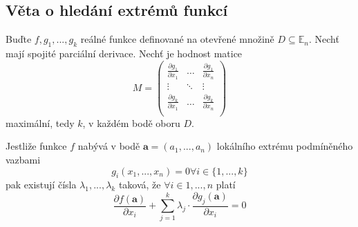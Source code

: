 \documentclass[10pt]{article}
\begin{document}
\subsection{Věta o hledání extrémů funkcí}
\hspace{1.2mm}
\noindent
Buďte $f,g_1, ... , g_k$ reálné funkce definované na otevřené množině $D \subseteq \mathbb{E}_n$.
Nechť mají spojité parciální derivace. Nechť je hodnost matice
\[ M = \begin{pmatrix}
\frac{\partial g_1}{\partial x_1} & \dots & \frac{\partial g_1}{\partial x_n}\\
\vdots & \ddots & \vdots\\
\frac{\partial g_k}{\partial x_1} & \dots & \frac{\partial g_k}{\partial x_n}\\
\end{pmatrix}\]
maximální, tedy $k$, v každém bodě oboru $D$.

\noindent
\hspace{1.2mm}
Jestliže funkce $f$ nabývá v bodě $\mathbf{a} = (a_1, ... , a_n)$ lokálního extrému podmíněného vazbami
\[ g_i(x_1, ... , x_n) = 0 \forall i \in \{ 1, ... , k \} \]
pak existují čísla $\lambda _1, ... , \lambda _k$ taková, že $\forall i \in {1, ... , n}$ platí
\[ \frac{\partial f(\mathbf{a})}{\partial x_i} +
\sum_{j=1}^{k}\lambda_j \cdot \frac{\partial g_j(\mathbf{a})}{\partial x_i} = 0 \]
\end{document}
